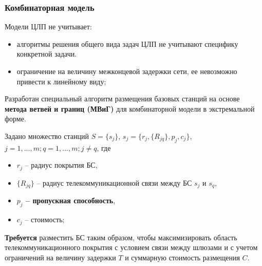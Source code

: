\begin{frame}
    \frametitle{Комбинаторная модель}
    \justifying
    Модели ЦЛП не учитывает:
    \begin{itemize}
        \item алгоритмы решения общего вида задач ЦЛП не учитывают специфику конкретной задачи.
        \item ограничение на величину межконцевой задержки сети, ее невозможно привести к линейному виду;
    \end{itemize}
    

    \medskip
    Разработан специальный алгоритм размещения базовых станций на основе \textbf{метода ветвей и границ (МВиГ)} для комбинаторной модели в экстремальной форме.

    \medskip

    Задано множество станций $S = \{s_j\}$, $s_j=\{r_j,\{R_{jq} \},p_j, c_j \}$, $j=1,...,m;q=1,...,m;j \neq q $, где 
    \begin{itemize}
        \item $r_j$ -- радиус покрытия БС,
        \item $\{R_{jq}\}$ -- радиус телекоммуникационной связи между БС $s_j$ и $s_q$,
        \item \textbf{$p_j$ -- пропускная способность},
        \item $c_j$ -- стоимость;
    \end{itemize} 

    \medskip
    \textbf{Требуется} разместить БС таким образом, чтобы максимизировать область телекоммуникационного покрытия с условием связи между шлюзами и с учетом ограничений на величину задержки $T$ и суммарную стоимость размещения $C$.


\end{frame}


